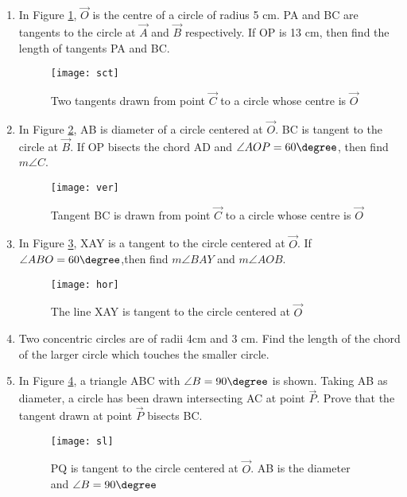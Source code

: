 \begin{enumerate}
	\item In Figure \ref{fig:sct1}, $\vec{O}$ is the centre of a circle of radius 5 cm. PA and BC are tangents to the circle at $\vec{A}$ and $\vec{B}$ respectively. If OP is 13 cm, then find the length of tangents PA and BC.
		\begin{figure}[H]
			\centering
			\texttt{[image: sct]}
			\caption{Two tangents drawn from point $\vec{C}$ to a circle whose centre is $\vec{O}$}
			\label{fig:sct1}
		\end{figure}

	\item In Figure \ref{fig:ver1}, AB is diameter of a circle centered at $\vec{O}$. BC is tangent to the circle at $\vec{B}$. If OP bisects the chord AD and $\angle AOP=60\degree$, then find $m\angle C$.
		\begin{figure}[H]
			\centering
			\texttt{[image: ver]}
			\caption{Tangent BC is drawn from point $\vec{C}$ to a circle whose centre is $\vec{O}$}
			\label{fig:ver1}
		\end{figure}

	\item In Figure \ref{fig:hor1}, XAY is a tangent to the circle centered at $\vec{O}$. If $\angle ABO=60\degree$,then find $m\angle BAY$ and $m\angle AOB$.
		\begin{figure}
			\centering
			\texttt{[image: hor]}
			\caption{The line XAY is tangent to the circle centered at $\vec{O}$}
			\label{fig:hor1}
		\end{figure}

	\item Two concentric circles are of radii 4cm and 3 cm. Find the length of the chord of the larger circle which touches the smaller circle.

	\item In Figure \ref{fig:sl1}, a triangle ABC with $\angle B=90\degree$ is shown. Taking AB as diameter, a circle has been drawn intersecting AC at point $\vec{P}$. Prove that the tangent drawn at point $\vec{P}$ bisects BC.
		\begin{figure}[H]
			\centering
			\texttt{[image: sl]}
			\caption{PQ is tangent to the circle centered at $\vec{O}$. AB is the diameter and $\angle B=90\degree$}
			\label{fig:sl1}
		\end{figure}
\end{enumerate}
